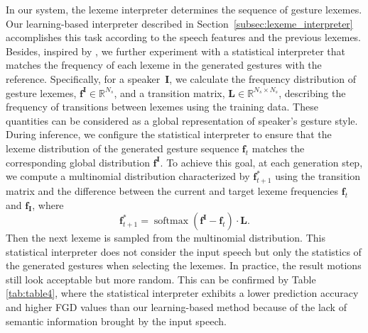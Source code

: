 \documentclass[acmtog,authorversion]{acmart}
\newcommand{\vect}[1]{\bm{#1}}
\DeclareMathOperator*{\softmax}{softmax}
\begin{document}
In our system, the lexeme interpreter determines the sequence of gesture lexemes. Our learning-based interpreter described in Section~\ref{subsec:lexeme_interpreter} accomplishes this task according to the speech features and the previous lexemes. Besides, inspired by \cite{aristidou2021rhythm}, we further experiment with a statistical interpreter that matches the frequency of each lexeme in the generated gestures with the reference. Specifically, for a speaker~$\vect{I}$, we calculate the frequency distribution of gesture lexemes, $\vect{f}^{\vect{I}}\in\mathbb{R}^{N_s}$, and a transition matrix, $\vect{L}\in\mathbb{R}^{N_s\times{}N_s}$, describing the frequency of transitions between lexemes using the training data. These quantities can be considered as a global representation of speaker's gesture style. 
During inference, we configure the statistical interpreter to ensure that the lexeme distribution of the generated gesture sequence $\vect{f}_t$ matches the corresponding global distribution $\vect{f}^{\vect{I}}$. 
To achieve this goal, at each generation step, we compute a multinomial distribution characterized by $\vect{f}^*_{t+1}$ using the transition matrix and the difference between the current and target lexeme frequencies $\vect{f}_t$ and $\vect{f}_{\vect{I}}$, where
\begin{equation}
    \vect{f}^*_{t+1} = \softmax(\vect{f}^{\vect{I}}-\vect{f}_t )
    \cdot \vect{L}.
\end{equation}
Then the next lexeme is sampled from the multinomial distribution.
This statistical interpreter does not consider the input speech but only the statistics of the generated gestures when selecting the lexemes. In practice, the result motions still look acceptable but more random. This can be confirmed by Table \ref{tab:table4}, where the statistical interpreter exhibits a lower prediction accuracy and higher FGD values than our learning-based method because of the lack of semantic information brought by the input speech.
\end{document}

